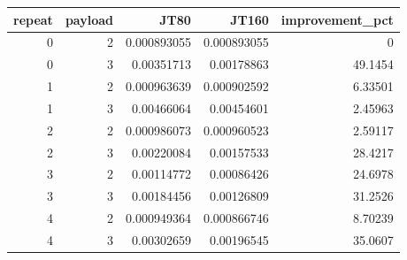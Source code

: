 \begin{tabular}{rrrrr}
\toprule
repeat & payload & JT80 & JT160 & improvement\_pct \\
\midrule
0 & 2 & 0.000893055 & 0.000893055 & 0 \\
0 & 3 & 0.00351713 & 0.00178863 & 49.1454 \\
1 & 2 & 0.000963639 & 0.000902592 & 6.33501 \\
1 & 3 & 0.00466064 & 0.00454601 & 2.45963 \\
2 & 2 & 0.000986073 & 0.000960523 & 2.59117 \\
2 & 3 & 0.00220084 & 0.00157533 & 28.4217 \\
3 & 2 & 0.00114772 & 0.00086426 & 24.6978 \\
3 & 3 & 0.00184456 & 0.00126809 & 31.2526 \\
4 & 2 & 0.000949364 & 0.000866746 & 8.70239 \\
4 & 3 & 0.00302659 & 0.00196545 & 35.0607 \\
\bottomrule
\end{tabular}
